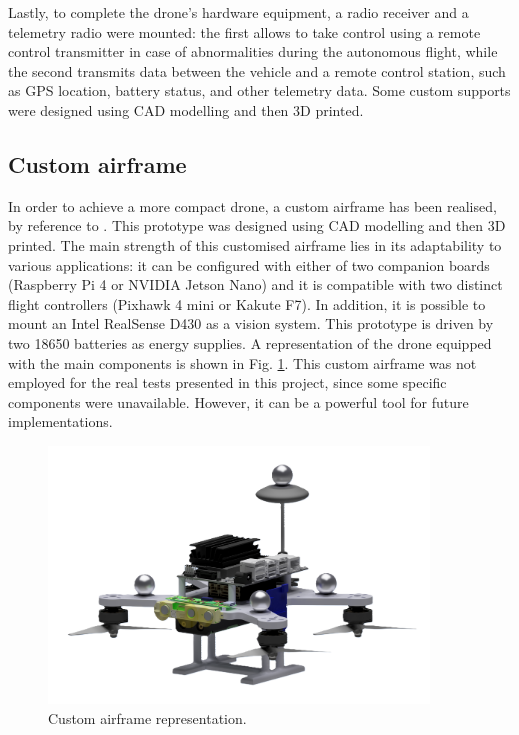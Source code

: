 \documentclass[journal]{IEEEtran}
\begin{document}
Lastly, to complete the drone's hardware equipment, a radio receiver and a telemetry radio were mounted: the first allows to take control using a remote control transmitter in case of abnormalities during the autonomous flight, while the second transmits data between the vehicle and a remote control station, such as GPS location, battery status, and other telemetry data. Some custom supports were designed using CAD modelling and then 3D printed.

\subsection{Custom airframe}

In order to achieve a more compact drone, a custom airframe has been realised, by reference to \cite{cinese}. This prototype was designed using CAD modelling and then 3D printed.
The main strength of this customised airframe lies in its adaptability to various applications: it can be configured with either of two companion boards (Raspberry Pi 4 or NVIDIA Jetson Nano) and it is compatible with two distinct flight controllers (Pixhawk 4 mini or Kakute F7). In addition, it is possible to mount an Intel RealSense D430 as a vision system. This prototype is driven by two 18650 batteries as energy supplies. A representation of the drone equipped with the main components is shown in Fig. \ref{fig:cad}. This custom airframe was not employed for the real tests presented in this project, since some specific components were unavailable. However, it can be a powerful tool for future implementations. 

 \begin{figure}
    \centering
    \includegraphics[width=0.9\textwidth]{Images/cad_drone_custom_nosfondo.png}
    \caption{Custom airframe representation.}
    \label{fig:cad}
\end{figure}
\end{document}
